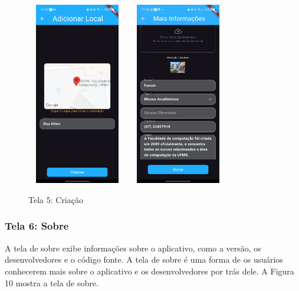    \begin{figure}[h]
        \centering
        \includegraphics[width=44mm,height=80mm]{imagens/criacao.jpg}
        \hspace{10mm}
        \includegraphics[width=44mm,height=80mm]{imagens/criacao2.jpg}
        \caption{\scriptsize Tela 5: Criação}
        \label{fig:tela5}
    \end{figure}

    \FloatBarrier

\subsubsection{Tela 6: Sobre}

    A tela de sobre exibe informações sobre o aplicativo, como a versão, os desenvolvedores e o código fonte. A tela de sobre é uma forma de os usuários conhecerem mais sobre o aplicativo e os desenvolvedores por trás dele. A Figura 10 mostra a tela de sobre.

